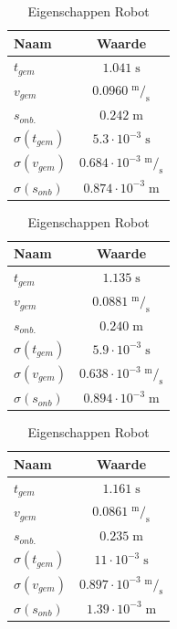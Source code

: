 \documentclass{report}
\begin{document}
\begin{table}
	\centering
	\caption{Eigenschappen Robot}
	\label{tab:resCali}
	\begin{subtable}[b]{0.30\textwidth}
		\centering
		\begin{tabular}{| l| c|}
		\hline
			Naam & Waarde \\
		\hline
			$t_{gem}$ & $1.041 \;\mathrm{s}$ \\
		\hline
			$v_{gem}$ & $0.0960\;  \mathrm{ ^m/_s}$\\
		\hline
			$s_{onb.}$ & $0.242 \;\mathrm{m}$ \\
		\hline		  
		   $\sigma(t_{gem})$ & $ 5.3 \cdot 10^{-3}\; \mathrm{s}$  \\
		\hline
		   $\sigma(v_{gem})$ & $0.684 \cdot 10^{-3}\;  \mathrm{ ^m/_s}$ \\
		\hline
		$\sigma(s_{onb})$ & $0.874 \cdot 10^{-3}\; \mathrm{m}$ \\
		\hline
		\end{tabular}
	\end{subtable}
	\quad
	\begin{subtable}[b]{0.30\textwidth}
		\centering
		\begin{tabular}{| l| c|}
		\hline
		   Naam & Waarde \\
		\hline
		   $t_{gem}$ & $1.135  \;\mathrm{s}$ \\
		\hline
		   $v_{gem}$ &$ 0.0881\;  \mathrm{ ^m/_s}$ \\
		\hline
		$s_{onb.}$ &$ 0.240 \;\mathrm{m}$ \\
		\hline		  
		   $\sigma(t_{gem})$ & $5.9 \cdot 10^{-3}\; \mathrm{s}$  \\
		\hline
		   $\sigma(v_{gem})$ & $0.638 \cdot 10^{-3}\;  \mathrm{ ^m/_s}$ \\
		\hline
		$\sigma(s_{onb})$ &$ 0.894 \cdot 10^{-3}\; \mathrm{m}$ \\
		\hline
		\end{tabular}
	\end{subtable}
	\quad
	\begin{subtable}[b]{0.30\textwidth}
		\centering
		\begin{tabular}{| l| c|}
		\hline
		   Naam & Waarde \\
		\hline
		   $t_{gem}$ & $1.161 \;\mathrm{s}$ \\
		\hline
		   $v_{gem}$ &$ 0.0861\;  \mathrm{ ^m/_s}$ \\
		\hline
			$s_{onb.}$ &$ 0.235 \;\mathrm{m}$ \\
		\hline		  
		   $\sigma(t_{gem})$ & $11 \cdot 10^{-3}\;\mathrm{s}$  \\
		\hline
		   $\sigma(v_{gem})$ & $0.897 \cdot 10^{-3}\; \mathrm{ ^m/_s}$ \\
		\hline
		$\sigma(s_{onb})$ & $1.39 \cdot 10^{-3}\; \mathrm{m}$ \\
		\hline
		\end{tabular}
	\end{subtable}
\end{table}
\end{document}
